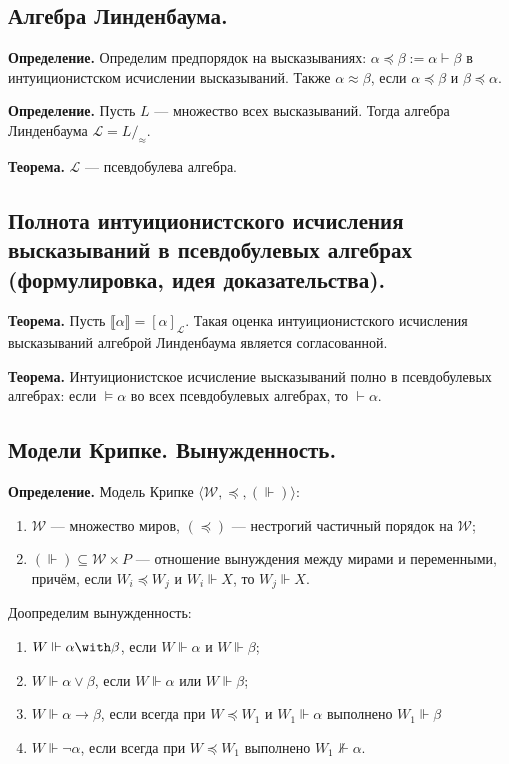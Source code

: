\documentclass[10pt,a4paper,oneside]{article}
\begin{document}
\subsection{Алгебра Линденбаума.}
\noindent \textbf{ Определение. }
Определим предпорядок на высказываниях: $\alpha \preceq \beta := \alpha \vdash \beta$ в интуиционистском исчислении высказываний.
Также $\alpha\approx\beta$, если $\alpha\preceq\beta$ и $\beta\preceq\alpha$.

\noindent \textbf{ Определение. }
Пусть $L$ --- множество всех высказываний. Тогда алгебра Линденбаума $\mathcal{L} = L/_\approx$.

\noindent \textbf{ Теорема. }
$\mathcal{L}$ --- псевдобулева алгебра.

\subsection{Полнота интуиционистского исчисления высказываний в псевдобулевых алгебрах (формулировка, идея доказательства).}
\noindent \textbf{ Теорема. }
Пусть $\llbracket\alpha\rrbracket = [\alpha]_\mathcal{L}$.
Такая оценка интуиционистского исчисления высказываний алгеброй Линденбаума является согласованной.

\noindent \textbf{ Теорема. }
Интуиционистское исчисление высказываний полно в псевдобулевых алгебрах:
если $\models\alpha$ во всех псевдобулевых алгебрах, то $\vdash\alpha$. 

\subsection{Модели Крипке. Вынужденность.}
\noindent \textbf{ Определение. }
Модель Крипке $\langle \mathcal{W}, \preceq, (\Vdash)\rangle$:
\begin{enumerate}
\item $\mathcal{W}$ --- множество миров, $(\preceq)$ --- нестрогий частичный порядок на $\mathcal{W}$;
\item $(\Vdash)\subseteq \mathcal{W}\times P$ --- отношение вынуждения
между мирами и переменными, причём, если $W_i \preceq W_j$ и $W_i \Vdash X$, то $W_j \Vdash X$.
\end{enumerate}


\noindent Доопределим вынужденность:
\begin{enumerate}
\item $W \Vdash \alpha\with\beta$, если $W \Vdash \alpha$ и $W \Vdash \beta$;
\item $W \Vdash \alpha\vee\beta$, если $W \Vdash \alpha$ или $W \Vdash \beta$;
\item $W \Vdash \alpha\rightarrow\beta$, если всегда при $W \preceq W_1$ и $W_1 \Vdash \alpha$ выполнено $W_1 \Vdash \beta$
\item $W \Vdash \neg\alpha$, если всегда при $W \preceq W_1$ выполнено $W_1 \not\Vdash \alpha$.
\end{enumerate}
\end{document}
